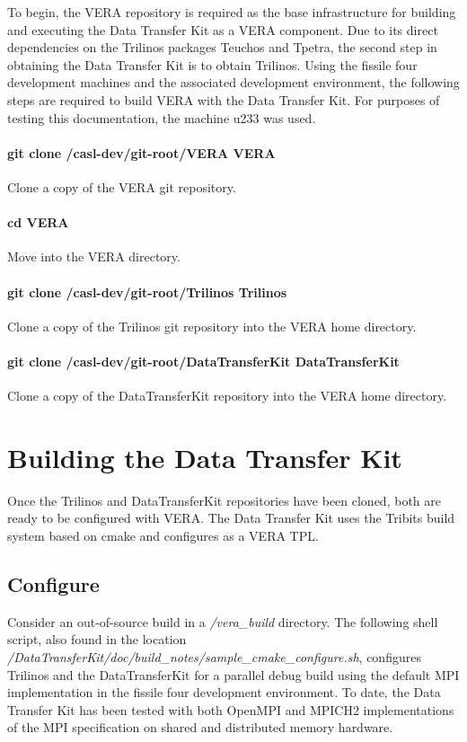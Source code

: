 \documentclass[letterpaper]{article}
\begin{document}
To begin, the VERA repository is required as the base infrastructure
for building and executing the Data Transfer Kit as a VERA
component. Due to its direct dependencies on the Trilinos packages
Teuchos and Tpetra, the second step in obtaining the Data Transfer Kit
is to obtain Trilinos. Using the fissile four development machines and
the associated development environment, the following steps are
required to build VERA with the Data Transfer Kit. For purposes of
testing this documentation, the machine u233 was used.

\paragraph{git clone /casl-dev/git-root/VERA VERA}
Clone a copy of the VERA git repository.

\paragraph{cd VERA}
Move into the VERA directory.

\paragraph{git clone /casl-dev/git-root/Trilinos Trilinos}
Clone a copy of the Trilinos git repository into the VERA home
directory. 

\paragraph{git clone /casl-dev/git-root/DataTransferKit DataTransferKit} 
Clone a copy of the DataTransferKit repository into the VERA home
directory.

\section{Building the Data Transfer Kit}
Once the Trilinos and DataTransferKit repositories have been cloned, both are
ready to be configured with VERA. The Data Transfer Kit uses the
Tribits build system based on cmake and configures as a VERA TPL.

\subsection{Configure}
Consider an out-of-source build in a {\sl /vera\_build} directory. The
following shell script, also found in the location {\sl
  /DataTransferKit/doc/build\_notes/sample\_cmake\_configure.sh},
configures Trilinos and the DataTransferKit for a parallel debug build
using the default MPI implementation in the fissile four development
environment. To date, the Data Transfer Kit has been tested with both
OpenMPI and MPICH2 implementations of the MPI specification on shared
and distributed memory hardware.
\end{document}
